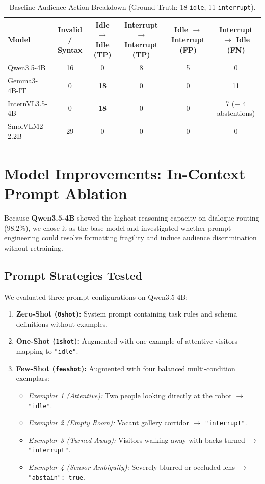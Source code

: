 ﻿\documentclass[11pt,a4paper]{article}
\begin{document}
\begin{table}[htbp]
\centering
\small
\caption{Baseline Audience Action Breakdown (Ground Truth: 18 \texttt{idle}, 11 \texttt{interrupt}).}
\label{tab:baseline_confusion}
\begin{tabular*}{\textwidth}{@{\extracolsep{\fill}}lccccc@{}}
\toprule
\textbf{Model} & \textbf{Invalid / Syntax} & \textbf{Idle $\to$ Idle (TP)} & \textbf{Interrupt $\to$ Interrupt (TP)} & \textbf{Idle $\to$ Interrupt (FP)} & \textbf{Interrupt $\to$ Idle (FN)} \\
\midrule
Qwen3.5-4B & 16 & 0 & 8 & 5 & 0 \\
Gemma3-4B-IT & 0 & \textbf{18} & 0 & 0 & 11 \\
InternVL3.5-4B & 0 & \textbf{18} & 0 & 0 & 7 (+ 4 abstentions) \\
SmolVLM2-2.2B & 29 & 0 & 0 & 0 & 0 \\
\bottomrule
\end{tabular*}
\end{table}

\section{Model Improvements: In-Context Prompt Ablation}

Because \textbf{Qwen3.5-4B} showed the highest reasoning capacity on dialogue routing ($98.2\%$), we chose it as the base model and investigated whether prompt engineering could resolve formatting fragility and induce audience discrimination without retraining.

\subsection{Prompt Strategies Tested}
We evaluated three prompt configurations on Qwen3.5-4B:
\begin{enumerate}
    \item \textbf{Zero-Shot (\texttt{0shot}):} System prompt containing task rules and schema definitions without examples.
    \item \textbf{One-Shot (\texttt{1shot}):} Augmented with one example of attentive visitors mapping to \texttt{"idle"}.
    \item \textbf{Few-Shot (\texttt{fewshot}):} Augmented with four balanced multi-condition exemplars:
    \begin{itemize}
        \item \textit{Exemplar 1 (Attentive):} Two people looking directly at the robot $\to$ \texttt{"idle"}.
        \item \textit{Exemplar 2 (Empty Room):} Vacant gallery corridor $\to$ \texttt{"interrupt"}.
        \item \textit{Exemplar 3 (Turned Away):} Visitors walking away with backs turned $\to$ \texttt{"interrupt"}.
        \item \textit{Exemplar 4 (Sensor Ambiguity):} Severely blurred or occluded lens $\to$ \texttt{"abstain": true}.
    \end{itemize}
\end{enumerate}
\end{document}
